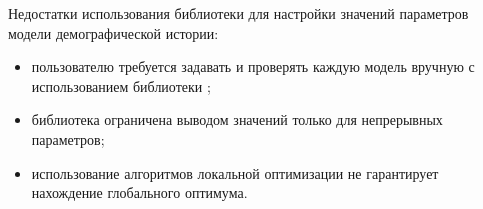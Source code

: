 \documentclass[a4paper,14pt,oneside,openany,article]{memoir}
\begin{document}
Недостатки использования библиотеки \dadi для настройки значений параметров модели демографической истории:
\begin{itemize}
    \item пользователю требуется задавать и проверять каждую модель вручную с использованием библиотеки \dadi;
    \item библиотека ограничена выводом значений только для непрерывных параметров;
    \item использование алгоритмов локальной оптимизации не гарантирует нахождение глобального оптимума.\\
\end{itemize}

\end{document}
